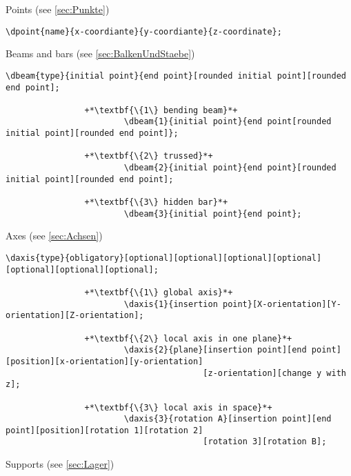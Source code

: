 \documentclass[%
  a4paper,
  BCOR20mm,
  pointlessnumbers,
  twoside,
  halfparskip,
  openright,
]{scrreprt}
\begin{document}
Points (see \ref{sec:Punkte})

\begin{lstlisting}[emph={dpoint},backgroundcolor=\color{white}]
		\dpoint{name}{x-coordiante}{y-coordiante}{z-coordinate};
\end{lstlisting}\vspace{-10mm}

Beams and bars (see \ref{sec:BalkenUndStaebe})

\begin{lstlisting}[emph={dbeam},backgroundcolor=\color{white}]
		\dbeam{type}{initial point}{end point}[rounded initial point][rounded end point];
		
				+*\textbf{\{1\} bending beam}*+
						\dbeam{1}{initial point}{end point[rounded initial point][rounded end point]};
						
				+*\textbf{\{2\} trussed}*+
						\dbeam{2}{initial point}{end point}[rounded initial point][rounded end point];
						
				+*\textbf{\{3\} hidden bar}*+
						\dbeam{3}{initial point}{end point};
\end{lstlisting}\vspace{-10mm}

\newpage

Axes (see \ref{sec:Achsen})

\begin{lstlisting}[emph={daxis},backgroundcolor=\color{white}]
		\daxis{type}{obligatory}[optional][optional][optional][optional][optional][optional][optional];
		
				+*\textbf{\{1\} global axis}*+
						\daxis{1}{insertion point}[X-orientation][Y-orientation][Z-orientation];
						
				+*\textbf{\{2\} local axis in one plane}*+
						\daxis{2}{plane}[insertion point][end point][position][x-orientation][y-orientation]
										[z-orientation][change y with z];
						
				+*\textbf{\{3\} local axis in space}*+
						\daxis{3}{rotation A}[insertion point][end point][position][rotation 1][rotation 2]
										[rotation 3][rotation B];
\end{lstlisting}\vspace{-10mm}

Supports (see \ref{sec:Lager})
\end{document}
